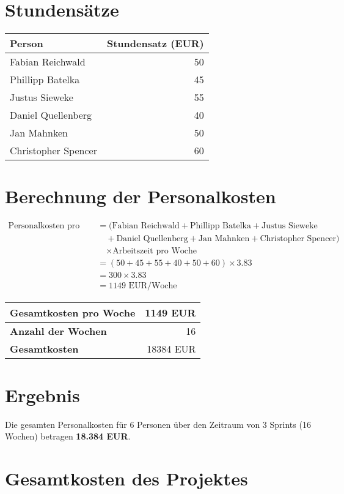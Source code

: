\section*{Stundensätze}
\begin{tabular}{lr}
  \toprule
  \textbf{Person} & \textbf{Stundensatz (EUR)} \\
  \midrule
  Fabian Reichwald & 50 \\
  Phillipp Batelka & 45 \\
  Justus Sieweke & 55 \\
  Daniel Quellenberg & 40 \\
  Jan Mahnken & 50 \\
  Christopher Spencer & 60 \\
  \bottomrule
\end{tabular}

\section*{Berechnung der Personalkosten}
\[
  \begin{aligned}
    \text{Personalkosten pro Woche} &= (\text{Fabian Reichwald} + \text{Phillipp Batelka} + \text{Justus Sieweke} \\
    &\quad + \text{Daniel Quellenberg} + \text{Jan Mahnken} + \text{Christopher Spencer}) \\
    &\quad \times \text{Arbeitszeit pro Woche} \\
    &= (50 + 45 + 55 + 40 + 50 + 60) \times 3.83 \\
    &= 300 \times 3.83 \\
    &= 1149 \text{ EUR/Woche}
  \end{aligned}
\]

\begin{tabular}{lr}
  \toprule
  \textbf{Gesamtkosten pro Woche} & 1149 EUR \\
  \midrule
  \textbf{Anzahl der Wochen} & 16 \\
  \midrule
  \textbf{Gesamtkosten} & 18384 EUR \\
  \bottomrule
\end{tabular}

\section*{Ergebnis}
Die gesamten Personalkosten für 6 Personen über den Zeitraum von 3 Sprints (16 Wochen) betragen \textbf{18.384 EUR}.

\section*{Gesamtkosten des Projektes}

